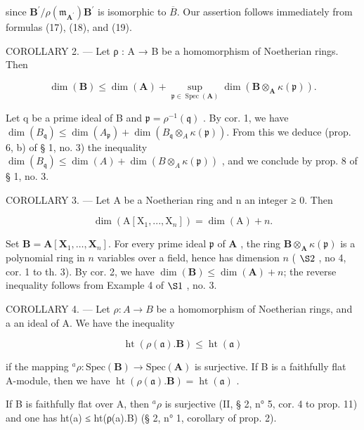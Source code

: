 since \(\mathbf{B}^{\prime}/\rho(\mathfrak{m}_{\mathbf{A}^{\prime}})\mathbf{B}^{\prime}\) is isomorphic to \(\overline{B}\). Our assertion follows immediately from formulas (17), (18), and (19).

COROLLARY 2. — Let ρ : A → B be a homomorphism of Noetherian rings. Then

\[
\dim (\mathbf {B}) \leqslant \dim (\mathbf {A}) + \sup _ {\mathfrak {p} \in \operatorname{Spec} (\mathbf {A})} \dim (\mathbf {B} \otimes_ {\mathbf {A}} \kappa (\mathfrak {p})).
\]

Let q be a prime ideal of B and \(\mathfrak{p} = \rho^{-1}(\mathfrak{q})\) . By cor. 1, we have \(\dim(B_{\mathfrak{q}}) \leqslant \dim(A_{\mathfrak{p}}) + \dim(B_{\mathfrak{q}} \otimes_{A} \kappa(\mathfrak{p}))\). From this we deduce (prop. 6, b) of § 1, no. 3) the inequality \(\dim(B_{\mathfrak{q}}) \leqslant \dim(A) + \dim(B \otimes_{A} \kappa(\mathfrak{p}))\) , and we conclude by prop. 8 of § 1, no. 3.

COROLLARY 3. --- Let A be a Noetherian ring and n an integer ≥ 0. Then

\[
\dim (\mathrm{A} [ \mathrm{X} _ {1},..., \mathrm{X} _ {n} ]) = \dim (\mathrm{A}) + n.
\]

Set \(\mathbf{B} = \mathbf{A}[\mathbf{X}_1, \ldots, \mathbf{X}_n]\). For every prime ideal \(\mathfrak{p}\) of \(\mathbf{A}\) , the ring \(\mathbf{B} \otimes_{\mathbf{A}} \kappa(\mathfrak{p})\) is a polynomial ring in \(n\) variables over a field, hence has dimension \(n\) ( \(\S 2\) , no 4, cor. 1 to th. 3). By cor. 2, we have \(\dim(\mathbf{B}) \leqslant \dim(\mathbf{A}) + n\); the reverse inequality follows from Example 4 of \(\S 1\) , no. 3.

COROLLARY 4. --- Let \(\rho: A \to B\) be a homomorphism of Noetherian rings, and a an ideal of A. We have the inequality

\[
\operatorname{ht} (\rho (\mathfrak {a}). \mathbf {B}) \leqslant \operatorname{ht} (\mathfrak {a})\tag{20}
\]

if the mapping \(^a\rho : \text{Spec}(\mathbf{B}) \to \text{Spec}(\mathbf{A})\) is surjective. If B is a faithfully flat A-module, then we have \(\operatorname{ht}(\rho(\mathfrak{a}).\mathbf{B}) = \operatorname{ht}(\mathfrak{a})\) .

If B is faithfully flat over A, then \(^{a}\rho\) is surjective (II, § 2, n° 5, cor. 4 to prop. 11) and one has ht(a) ≤ ht(ρ(a).B) (§ 2, n° 1, corollary of prop. 2).

